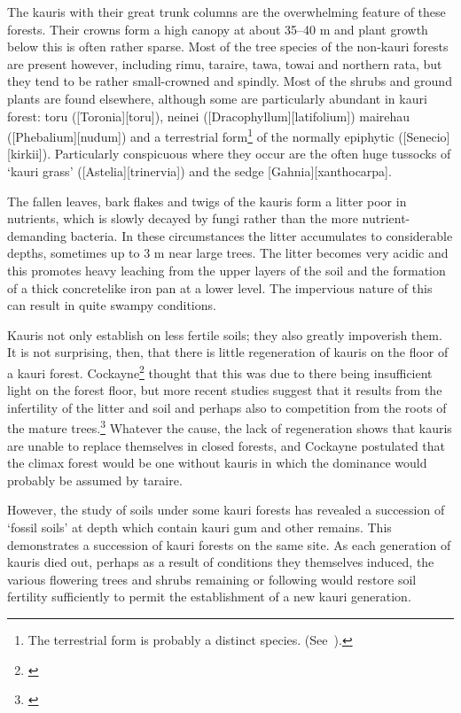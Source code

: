 The kauris with their great trunk columns are the overwhelming feature of these forests.
Their crowns form a high canopy at about 35--40 m and plant growth below this is often rather sparse.
Most of the tree species of the non-kauri forests are present however, including rimu, taraire, tawa, towai and northern rata, but they tend to be rather small-crowned and spindly.
Most of the shrubs and ground plants are found elsewhere, although some are particularly abundant in kauri forest: toru ([Toronia][toru]), neinei ([Dracophyllum][latifolium]) mairehau ([Phebalium][nudum]) and a terrestrial form\footnote{The terrestrial form is probably a distinct species. (See~\cite{eagle1982trees}).} of the normally epiphytic  ([Senecio][kirkii]).
Particularly conspicuous where they occur are the often huge tussocks of `kauri grass' ([Astelia][trinervia]) and the sedge [Gahnia][xanthocarpa].

The fallen leaves, bark flakes and twigs of the kauris form a litter poor in nutrients, which is slowly decayed by fungi rather than the more nutrient-demanding bacteria.
In these circumstances the litter accumulates to considerable depths, sometimes up to 3 m near large trees.
The litter becomes very acidic and this promotes heavy leaching from the upper layers of the soil and the formation of a thick concretelike iron pan at a lower level.
The impervious nature of this can result in quite swampy conditions.

Kauris not only establish on less fertile soils; they also greatly impoverish them.
It is not surprising, then, that there is little regeneration of kauris on the floor of a kauri forest.
Cockayne\footnote{\cite{cockayne1928vegetation}} thought that this was due to there being insufficient light on the forest floor, but more recent studies suggest that it results from the infertility of the litter and soil and perhaps also to competition from the roots of the mature trees.\footnote{\cite{bieleski1959factors}}
Whatever the cause, the lack of regeneration shows that kauris are unable to replace themselves in closed forests, and Cockayne postulated that the climax forest would be one without kauris in which the dominance would probably be assumed by taraire.

However, the study of soils under some kauri forests has revealed a succession of `fossil soils' at depth which contain kauri gum and other remains.
This demonstrates a succession of kauri forests on the same site.
As each generation of kauris died out, perhaps as a result of conditions they themselves induced, the various flowering trees and shrubs remaining or following would restore soil fertility sufficiently to permit the establishment of a new kauri generation.

